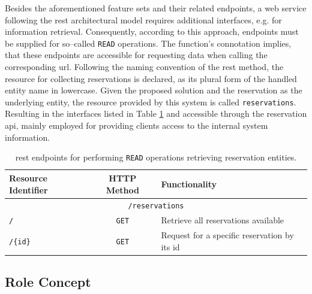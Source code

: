 Besides the aforementioned feature sets and their related endpoints, a web service following the \acrshort{rest} architectural model requires additional interfaces, e.g. for information retrieval.
Consequently, according to this approach, endpoints must be supplied for so--called \texttt{READ} operations. The function's connotation implies, that these endpoints are accessible for requesting data when calling the corresponding \acrshort{url}.
Following the naming convention of the \acrshort{rest} method, the resource for collecting reservations is declared, as its plural form of the handled entity name in lowercase. Given the proposed solution and the reservation as the underlying entity, the resource provided by this system is called \texttt{reservations}.
Resulting in the interfaces listed in Table \ref{tab:read-reservations-rest} and accessible through the reservation \acrshort{api}, mainly employed for providing clients access to the internal system information.

\begingroup
\setlength{\tabcolsep}{10pt} %
\renewcommand{\arraystretch}{1.5} %
\begin{table}[h]
\centering
\caption{\acrshort{rest} endpoints for performing \texttt{READ} operations retrieving reservation entities.}
    \begin{tabular}{l|c|m{5cm}}
    Resource Identifier & HTTP Method & Functionality \\ \hline
    \multicolumn{3}{c}{\texttt{/reservations}} \\ \hline
    \texttt{/} & \texttt{GET} & Retrieve all reservations available \\
    \texttt{/\{id\}} & \texttt{GET} & Request for a specific reservation by its \acrshort{id} \\
    \end{tabular}
\label{tab:read-reservations-rest}
\end{table}
\endgroup

\subsection{Role Concept}
\label{ch:Implementation:sec:Reservation System:ssec:Role Concept}

